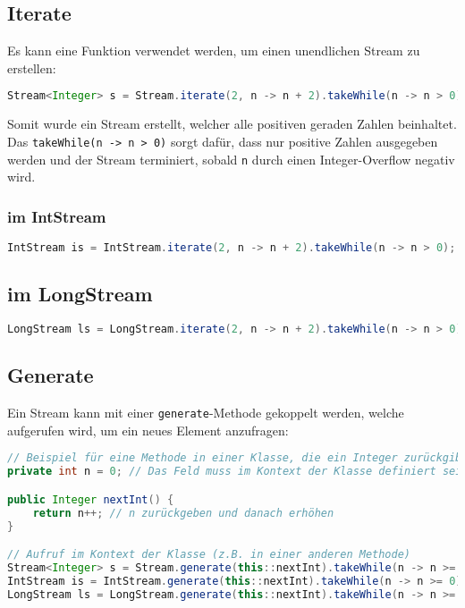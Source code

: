 \subsection{Iterate}
\label{iterate}

Es kann eine Funktion verwendet werden, um einen unendlichen Stream zu
erstellen:

\begin{lstlisting}[language=Java, caption={Unendlicher Stream mit Iterate}]
Stream<Integer> s = Stream.iterate(2, n -> n + 2).takeWhile(n -> n > 0);
\end{lstlisting}

Somit wurde ein Stream erstellt, welcher alle positiven geraden Zahlen
beinhaltet. Das
\lstinline{takeWhile(n -> n > 0)} sorgt dafür, dass nur positive Zahlen ausgegeben werden und der Stream terminiert, sobald \texttt{n}
durch einen Integer-Overflow negativ wird.

\subsubsection{im IntStream}

\begin{lstlisting}[language=Java, caption={Unendlicher Stream mit Iterate im IntStream}]
IntStream is = IntStream.iterate(2, n -> n + 2).takeWhile(n -> n > 0);
\end{lstlisting}

\subsection{im LongStream}

\begin{lstlisting}[language=Java, caption={Unendlicher Stream mit Iterate im LongStream}]
LongStream ls = LongStream.iterate(2, n -> n + 2).takeWhile(n -> n > 0);
\end{lstlisting}

\subsection{Generate}
\label{generate}

Ein Stream kann mit einer \lstinline{generate}-Methode gekoppelt werden, welche
aufgerufen wird, um ein neues Element anzufragen:

\begin{lstlisting}[language=Java, caption={Unendlicher Stream mit Generate}]
// Beispiel für eine Methode in einer Klasse, die ein Integer zurückgibt
private int n = 0; // Das Feld muss im Kontext der Klasse definiert sein

public Integer nextInt() {
    return n++; // n zurückgeben und danach erhöhen
}

// Aufruf im Kontext der Klasse (z.B. in einer anderen Methode)
Stream<Integer> s = Stream.generate(this::nextInt).takeWhile(n -> n >= 0);
IntStream is = IntStream.generate(this::nextInt).takeWhile(n -> n >= 0);
LongStream ls = LongStream.generate(this::nextInt).takeWhile(n -> n >= 0);
\end{lstlisting}

